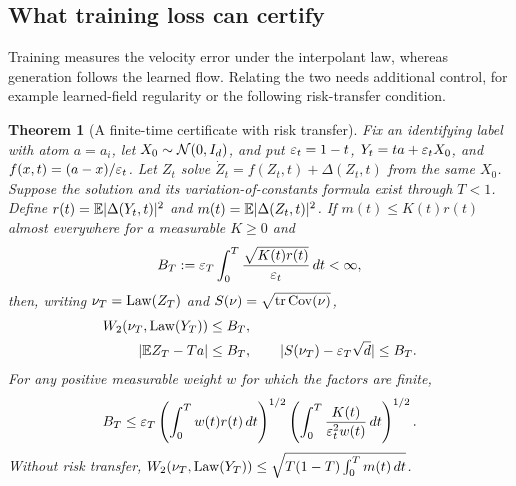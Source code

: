 \documentclass{article} %
\theoremstyle{plain}
\newtheorem{theorem}{Theorem}[section]
\theoremstyle{definition}
\theoremstyle{remark}
\begin{document}
\subsection{What training loss can certify}
\label{app:teacher-risk}

Training measures the velocity error under the interpolant law, whereas generation follows the
learned flow. Relating the two needs additional control, for example learned-field regularity
\citep{benton2024error} or the following risk-transfer condition.

\begin{theorem}[A finite-time certificate with risk transfer]
\label{thm:risktransfer}
Fix an identifying label with atom $a=a_i$, let $X_0\sim\mathcal{N}(0,I_d)$, and put
$\varepsilon_t=1-t$, $Y_t=ta+\varepsilon_tX_0$, and $f(x,t)=(a-x)/\varepsilon_t$.
Let $Z_t$ solve $\dot Z_t=f(Z_t,t)+\Delta(Z_t,t)$ from the same $X_0$.
Suppose the solution and its variation-of-constants formula exist through $T<1$.
Define $r(t)=\mathbb{E}|\Delta(Y_t,t)|^2$ and $m(t)=\mathbb{E}|\Delta(Z_t,t)|^2$.
If $m(t)\le K(t)r(t)$ almost everywhere for a measurable $K\ge0$ and
\[
B_T:=\varepsilon_T\int_0^T\frac{\sqrt{K(t)r(t)}}{\varepsilon_t}\,dt<\infty,
\]
then, writing $\nu_T=\mathrm{Law}(Z_T)$ and $S(\nu)=\sqrt{\operatorname{tr}\operatorname{Cov}(\nu)}$,
\begin{align}
W_2(\nu_T,\mathrm{Law}(Y_T))&\le B_T,\label{eq:risktransfer}\\
|\mathbb{E} Z_T-Ta|&\le B_T,\qquad
|S(\nu_T)-\varepsilon_T\sqrt d|\le B_T.\label{eq:riskmoments}
\end{align}
For any positive measurable weight $w$ for which the factors are finite,
\[
B_T\le\varepsilon_T\left(\int_0^T w(t)r(t)\,dt\right)^{1/2}
\left(\int_0^T\frac{K(t)}{\varepsilon_t^2w(t)}\,dt\right)^{1/2}.
\]
Without risk transfer, $W_2(\nu_T,\mathrm{Law}(Y_T))\le\sqrt{T(1-T)\int_0^T m(t)\,dt}$.
\end{theorem}
\end{document}
